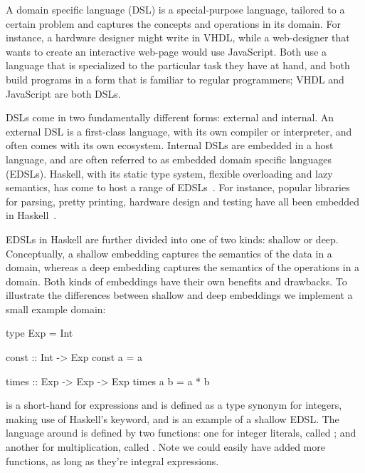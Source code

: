 \documentclass[../paper.tex]{subfiles}
\begin{document}
A domain specific language (DSL) is a special-purpose language, tailored to a certain problem and captures the concepts and operations in its domain. For instance, a hardware designer might write in VHDL, while a web-designer that wants to create an interactive web-page would use JavaScript. Both use a language that is specialized to the particular task they have at hand, and both build programs in a form that is familiar to regular programmers; VHDL and JavaScript are both DSLs.

DSLs come in two fundamentally different forms: external and internal. An external DSL is a first-class language, with its own compiler or interpreter, and often comes with its own ecosystem. Internal DSLs are embedded in a host language, and are often referred to as embedded domain specific languages (EDSLs). Haskell, with its static type system, flexible overloading and lazy semantics, has come to host a range of EDSLs~\cite{elliott2003}. For instance, popular libraries for parsing, pretty printing, hardware design and testing have all been embedded in Haskell~\cite{leijen2002, hughes1995, bjesse1998}.


EDSLs in Haskell are further divided into one of two kinds: shallow or deep. Conceptually, a shallow embedding captures the semantics of the data in a domain, whereas a deep embedding captures the semantics of the operations in a domain. Both kinds of embeddings have their own benefits and drawbacks. To illustrate the differences between shallow and deep embeddings we implement a small example domain:


\begin{code}
type Exp = Int

const :: Int -> Exp
const a = a

times :: Exp -> Exp -> Exp
times a b = a * b
\end{code}

\noindent {} is a short-hand for expressions and is defined as a type synonym for integers, making use of Haskell's  keyword, and is an example of a shallow EDSL. The language around  is defined by two functions: one for integer literals, called ; and another for multiplication, called . Note we could easily have added more functions, as long as they're integral expressions.
\end{document}
